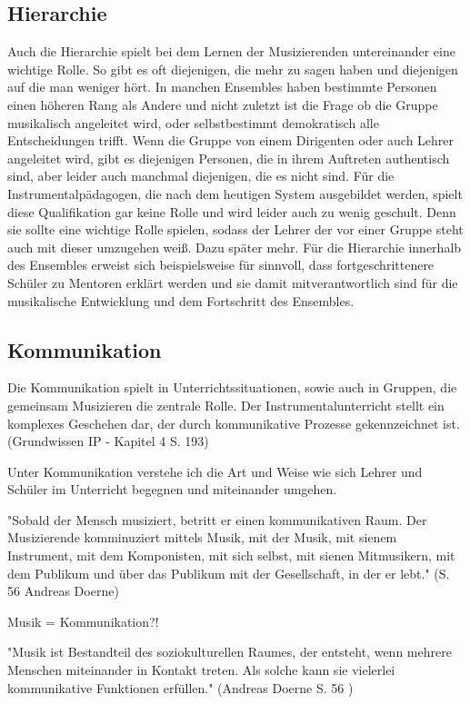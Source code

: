 \subsection{Hierarchie}
Auch die Hierarchie spielt bei dem Lernen der Musizierenden untereinander eine
wichtige Rolle. So gibt es oft diejenigen, die mehr zu sagen haben und
diejenigen auf die man weniger hört. In manchen Ensembles haben bestimmte
Personen einen höheren Rang als Andere und nicht zuletzt ist die Frage ob die
Gruppe musikalisch angeleitet wird, oder selbstbestimmt demokratisch alle
Entscheidungen trifft. Wenn die Gruppe von einem Dirigenten oder auch Lehrer
angeleitet wird, gibt es diejenigen Personen, die in ihrem Auftreten authentisch
sind, aber leider auch manchmal diejenigen, die es nicht sind. Für die
Instrumentalpädagogen, die nach dem heutigen System ausgebildet werden, spielt
diese Qualifikation gar keine Rolle und wird leider auch zu wenig geschult. Denn
sie sollte eine wichtige Rolle spielen, sodass der Lehrer der vor einer Gruppe
steht auch mit dieser umzugehen weiß. Dazu später mehr. Für die Hierarchie
innerhalb des Ensembles erweist sich beispielsweise für sinnvoll, dass 
fortgeschrittenere Schüler zu Mentoren erklärt werden und sie
damit
mitverantwortlich sind 
für die musikalische Entwicklung und dem Fortschritt des Ensembles. \autocite[95]{doerne:umfassend_musizieren}


\subsection{Kommunikation}
Die Kommunikation spielt in Unterrichtssituationen, sowie auch in Gruppen, die
gemeinsam Musizieren die zentrale Rolle. Der Instrumentalunterricht stellt ein komplexes Geschehen dar, der
durch
kommunikative Prozesse gekennzeichnet ist. (Grundwissen IP - Kapitel 4 S. 193)

Unter Kommunikation verstehe ich die Art und Weise wie sich Lehrer und Schüler
im Unterricht begegnen und miteinander umgehen. 

"Sobald der Mensch musiziert, betritt er einen kommunikativen Raum. Der
Musizierende komminuziert mittels Musik, mit der Musik, mit sienem Instrument,
mit dem Komponisten, mit sich selbst, mit sienen Mitmusikern, mit dem Publikum
und über das Publikum mit der Gesellschaft, in der er lebt." (S. 56 Andreas
Doerne)

Musik = Kommunikation?! 

"Musik ist Bestandteil des soziokulturellen Raumes, der entsteht, wenn mehrere
Menschen miteinander in Kontakt treten. Als solche kann sie vielerlei
kommunikative Funktionen erfüllen." (Andreas Doerne S. 56 )

